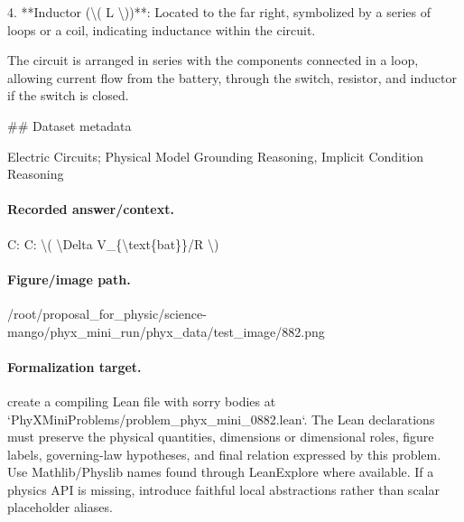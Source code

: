 4. **Inductor (\textbackslash{}( L \textbackslash{}))**: Located to the far right, symbolized by a series of loops or a coil, indicating inductance within the circuit.

The circuit is arranged in series with the components connected in a loop, allowing current flow from the battery, through the switch, resistor, and inductor if the switch is closed.

\#\# Dataset metadata

Electric Circuits; Physical Model Grounding Reasoning, Implicit Condition Reasoning

\paragraph{Recorded answer/context.}
C: C: \textbackslash{}( \textbackslash{}Delta V\_\{\textbackslash{}text\{bat\}\}/R \textbackslash{})

\paragraph{Figure/image path.}
/root/proposal\_for\_physic/science-mango/phyx\_mini\_run/phyx\_data/test\_image/882.png

\paragraph{Formalization target.}
create a compiling Lean file with sorry bodies at `PhyXMiniProblems/problem\_phyx\_mini\_0882.lean`. The Lean declarations must preserve the physical quantities, dimensions or dimensional roles, figure labels, governing-law hypotheses, and final relation expressed by this problem.
Use Mathlib/Physlib names found through LeanExplore where available. If a physics API is missing, introduce faithful local abstractions rather than scalar placeholder aliases.

